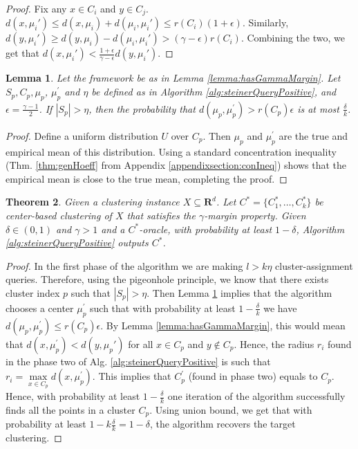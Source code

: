 \documentclass[12pt]{article}
\newcommand{\mb}{\mathbf}
\newtheorem{theorem}{Theorem}
\newtheorem{lemma}[theorem]{Lemma}
\begin{document}
\begin{proof}
Fix any $x \in C_i$ and $y \in C_j$. $d(x, \mu_i') \le d(x, \mu_i)+d(\mu_i, \mu_i') \le r(C_i) (1+\epsilon)$. Similarly, $d(y, \mu_i') \ge d(y, \mu_i) - d(\mu_i, \mu_i') > (\gamma -\epsilon)r(C_i)$. Combining the two, we get that $d(x, \mu_i') < \frac{1+\epsilon}{\gamma-\epsilon}d(y, \mu_i')$. 
\end{proof}

\begin{lemma}
\label{lemma:phase1}
Let the framework be as in Lemma \ref{lemma:hasGammaMargin}. Let $S_p, C_p, \mu_p$, $\mu_p^\prime$ and $\eta$ be defined as in Algorithm \ref{alg:steinerQueryPositive}, and $\epsilon = \frac{\gamma - 1}{2}$. If $|S_p| > \eta$, then the probability that $d(\mu_p, \mu_p^\prime) > r(C_p)\epsilon$ is at most $\frac{\delta}{k}$.
\end{lemma}
\begin{proof}
Define a uniform distribution $U$ over $C_p$. Then $\mu_p$ and $\mu_p^\prime$ are the true and empirical mean of this distribution. Using a standard concentration inequality (Thm. \ref{thm:genHoeff} from Appendix \ref{appendixsection:conIneq}) shows that the empirical mean is close to the true mean, completing the proof. 
\end{proof}

\begin{theorem}
\label{thm:steinerQueryPositive}
Given a clustering instance $X \subseteq \mb R^d$. Let $C^* = \{C_1^*, \ldots, C_k^*\}$ be center-based clustering of $X$ that satisfies the $\gamma$-margin property. Given $\delta \in (0, 1)$ and $\gamma > 1$ and a $C^*$-oracle, with probability at least $1-\delta$, Algorithm \ref{alg:steinerQueryPositive} outputs $C^*$.
\end{theorem}

\begin{proof}
In the first phase of the algorithm we are making $l>k\eta$ cluster-assignment queries. Therefore, using the pigeonhole principle, we know that there exists cluster index $p$ such that $|S_p| > \eta$. Then Lemma \ref{lemma:phase1} implies that the algorithm chooses a center $\mu_p^\prime$ such that with probability at least $1-\frac{\delta}{k}$ we have $d(\mu_p, \mu_p^\prime) \le r(C_p)\epsilon$. By Lemma \ref{lemma:hasGammaMargin}, this would mean that $d(x, \mu_p^\prime) < d(y, \mu_p')$ for all $x \in C_p$ and $y \not\in C_p$. Hence, the radius $r_i$ found in the phase two of Alg. \ref{alg:steinerQueryPositive} is such that $r_{i} = \max\limits_{x \in C_p} d(x, \mu_p^\prime)$. This implies that $C_p^\prime$ (found in phase two) equals to $C_p$. Hence, with probability at least $1-\frac{\delta}{k}$ one iteration of the algorithm successfully finds all the points in a cluster $C_p$. Using union bound, we get that with probability at least $1-k\frac{\delta}{k} = 1-\delta$, the algorithm recovers the target clustering.
\end{proof}
\end{document}
